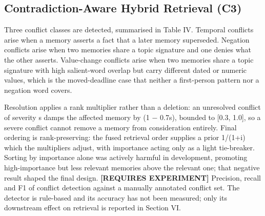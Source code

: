 \documentclass[conference]{IEEEtran}
\begin{document}
\subsection{Contradiction-Aware Hybrid Retrieval (C3)}
Three conflict classes are detected, summarised in Table IV. Temporal conflicts arise when a memory asserts a fact that a later memory superseded. Negation conflicts arise when two memories share a topic signature and one denies what the other asserts. Value-change conflicts arise when two memories share a topic signature with high salient-word overlap but carry different dated or numeric values, which is the moved-deadline case that neither a first-person pattern nor a negation word covers.
\begin{table}[!t]
\caption{Conflict Classes and Example Pairs}
\label{tab:iv}
\centering
{}
\end{table}

Resolution applies a rank multiplier rather than a deletion: an unresolved conflict of severity s damps the affected memory by (1 $-$ 0.7s), bounded to [0.3, 1.0], so a severe conflict cannot remove a memory from consideration entirely. Final ordering is rank-preserving: the fused retrieval order supplies a prior 1/(1+i) which the multipliers adjust, with importance acting only as a light tie-breaker. Sorting by importance alone was actively harmful in development, promoting high-importance but less relevant memories above the relevant one; that negative result shaped the final design.
\textbf{[REQUIRES EXPERIMENT]} Precision, recall and F1 of conflict detection against a manually annotated conflict set. The detector is rule-based and its accuracy has not been measured; only its downstream effect on retrieval is reported in Section VI.
\end{document}
